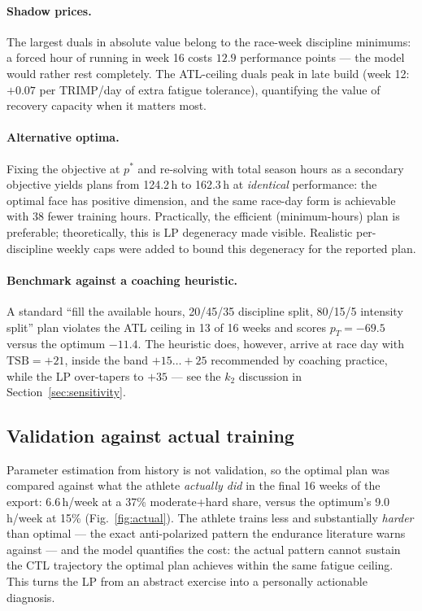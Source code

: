 \documentclass[11pt,a4paper]{article}
\begin{document}
\paragraph{Shadow prices.} The largest duals in absolute value belong to the
race-week discipline minimums: a forced hour of running in week 16 costs $12.9$
performance points --- the model would rather rest completely. The ATL-ceiling duals
peak in late build (week 12: $+0.07$ per TRIMP/day of extra fatigue tolerance),
quantifying the value of recovery capacity when it matters most.

\paragraph{Alternative optima.} Fixing the objective at $p^\ast$ and re-solving
with total season hours as a secondary objective yields plans from 124.2\,h to
162.3\,h at \emph{identical} performance: the optimal face has positive dimension,
and the same race-day form is achievable with 38 fewer training hours. Practically,
the efficient (minimum-hours) plan is preferable; theoretically, this is LP
degeneracy made visible. Realistic per-discipline weekly caps were added to bound
this degeneracy for the reported plan.

\paragraph{Benchmark against a coaching heuristic.} A standard
``fill the available hours, 20/45/35 discipline split, 80/15/5 intensity split''
plan violates the ATL ceiling in 13 of 16 weeks and scores $p_T=-69.5$ versus the
optimum $-11.4$. The heuristic does, however, arrive at race day with
$\text{TSB}=+21$, inside the band $+15\ldots+25$ recommended by coaching practice,
while the LP over-tapers to $+35$ --- see the $k_2$ discussion in
Section~\ref{sec:sensitivity}.

\subsection{Validation against actual training}

Parameter estimation from history is not validation, so the optimal plan was
compared against what the athlete \emph{actually did} in the final 16 weeks of
the export: 6.6\,h/week at a 37\% moderate+hard share, versus the optimum's
9.0\,h/week at 15\% (Fig.~\ref{fig:actual}). The athlete trains less and
substantially \emph{harder} than optimal --- the exact anti-polarized pattern the
endurance literature warns against --- and the model quantifies the cost: the
actual pattern cannot sustain the CTL trajectory the optimal plan achieves
within the same fatigue ceiling. This turns the LP from an abstract exercise
into a personally actionable diagnosis.
\end{document}

